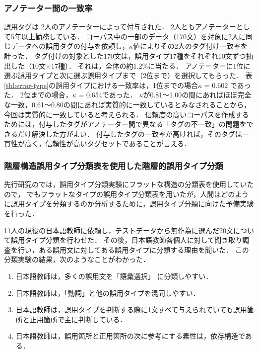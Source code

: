 \documentclass[japanese]{jnlp_1.4}
\begin{document}
\subsubsection{アノテーター間の一致率}

誤用タグは 2人のアノテーターによって付与された．
2人ともアノテーターとして5年以上勤務している．
コーパス中の一部のデータ（170文）を対象に2人に同じデータへの誤用タグの付与を依頼し，$\kappa$値\cite{kappa}によりその2人のタグ付け一致率を計った．
タグ付けの対象とした170文は，誤用タイプ17種をそれぞれ10文ずつ抽出した（10文×17種）．
それは，全体の約1.2\%に当たる．
アノテーターに1位に選ぶ誤用タイプと次に選ぶ誤用タイプまで（2位まで）を選択してもらった．
表\ref{tbl:error-type}の誤用タイプにおける一致率は，1位までの場合$\kappa$ = 0.602 であった．
2位までの場合，$\kappa$ = 0.654であった．
$\kappa$が0.81〜1.00の間にあればほぼ完全な一致，0.61〜0.80の間にあれば実質的に一致しているとみなされることから，今回は実質的に一致していると考えられる\cite{kappa}．
信頼度の高いコーパスを作成するためには，付与したタグがアノテーター間で異なる「タグの不一致」の問題をできるだけ解決した方がよい．
付与したタグの一致率が高ければ，そのタグは一貫性が高く，信頼性が高いタグセットであることが言える．


\subsubsection{階層構造誤用タイプ分類表を使用した階層的誤用タイプ分類}

先行研究のでは，誤用タイプ分類実験にフラットな構造の分類表を使用していたので，
でもフラットなタイプの誤用タイプ分類表を用いたが，人間はどのように誤用タイプを分類するのか分析するために，誤用タイプ分類に向けた予備実験を行った．

11人の現役の日本語教師に依頼し，テストデータから無作為に選んだ20文について誤用タイプ分類を行わせた．
その後，日本語教師各個人に対して聞き取り調査を行い，ある誤用文に対してある誤用タイプに分類する理由を聞いた．
この分類実験の結果，次のようなことがわかった．

\begin{enumerate}
\item 日本語教師は，多くの誤用文を「語彙選択」 に分類しやすい．
\item 日本語教師は，「動詞」と他の誤用タイプを混同しやすい．
\item 日本語教師は，誤用タイプを判断する際に1文すべて与えられていても誤用箇所と正用箇所で主に判断している．
\item 日本語教師は，誤用箇所と正用箇所の次に参考にする素性は，依存構造である．
\end{enumerate}
\end{document}
